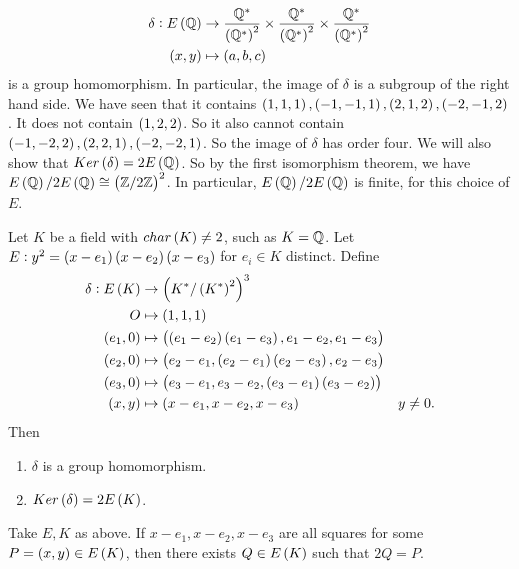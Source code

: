 \begin{example*}
\begin{align*}
\delta : E\br{\Q} & \to \dfrac{\Q^*}{\br{\Q^*}^2} \times \dfrac{\Q^*}{\br{\Q^*}^2} \times \dfrac{\Q^*}{\br{\Q^*}^2} \\
\br{x, y} & \mapsto \br{a, b, c}
\end{align*}
is a group homomorphism. In particular, the image of $ \delta $ is a subgroup of the right hand side. We have seen that it contains $ \br{1, 1, 1}, \br{-1, -1, 1}, \br{2, 1, 2}, \br{-2, -1, 2} $. It does not contain $ \br{1, 2, 2} $. So it also cannot contain $ \br{-1, -2, 2}, \br{2, 2, 1}, \br{-2, -2, 1} $. So the image of $ \delta $ has order four. We will also show that $ Ker\br{\delta} = 2E\br{\Q} $. So by the first isomorphism theorem, we have $ E\br{\Q} / 2E\br{\Q} \cong \br{\Z / 2\Z}^2 $. In particular, $ E\br{\Q} / 2E\br{\Q} $ is finite, for this choice of $ E $.
\end{example*}


\begin{theorem}
\label{thm:8.2}
Let $ K $ be a field with $ char\br{K} \ne 2 $, such as $ K = \mathbb{Q} $. Let $ E : y^2 = \br{x - e_1}\br{x - e_2}\br{x - e_3} $ for $ e_i \in K $ distinct. Define
\begin{align*}
\delta : E\br{K} & \to \br{K^* / \br{K^*}^2}^3 \\
O & \mapsto \br{1, 1, 1} \\
\br{e_1, 0} & \mapsto \br{\br{e_1 - e_2}\br{e_1 - e_3}, e_1 - e_2, e_1 - e_3} \\
\br{e_2, 0} & \mapsto \br{e_2 - e_1, \br{e_2 - e_1}\br{e_2 - e_3}, e_2 - e_3} \\
\br{e_3, 0} & \mapsto \br{e_3 - e_1, e_3 - e_2, \br{e_3 - e_1}\br{e_3 - e_2}} \\
\br{x, y} & \mapsto \br{x - e_1, x - e_2, x - e_3} & y \ne 0.
\end{align*}
Then
\begin{enumerate}
\item $ \delta $ is a group homomorphism.
\item $ Ker\br{\delta} = 2E\br{K} $.
\end{enumerate}
\end{theorem}

\pagebreak

\begin{lemma}
\label{lem:8.3}
Take $ E, K $ as above. If $ x - e_1, x - e_2, x - e_3 $ are all squares for some $ P = \br{x, y} \in E\br{K} $, then there exists $ Q \in E\br{K} $ such that $ 2Q = P $.
\end{lemma}


